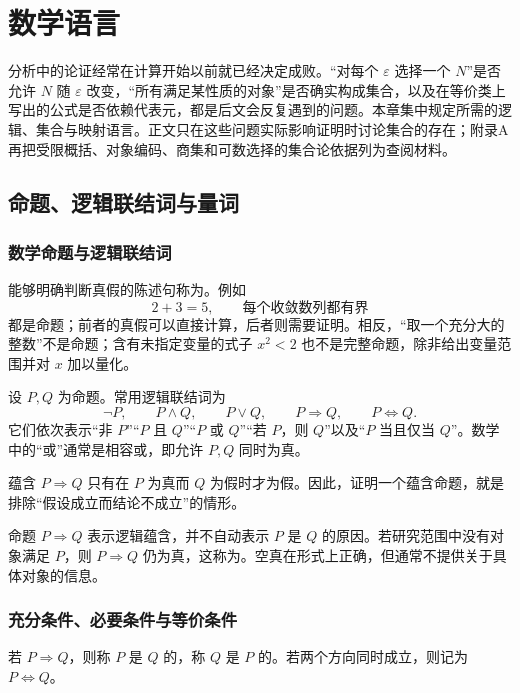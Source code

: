 \chapter{数学语言}
\label{chap:mathematical-language}

分析中的论证经常在计算开始以前就已经决定成败。“对每个 \(\varepsilon\) 选择一个 \(N\)”是否允许 \(N\) 随 \(\varepsilon\) 改变，“所有满足某性质的对象”是否确实构成集合，以及在等价类上写出的公式是否依赖代表元，都是后文会反复遇到的问题。本章集中规定所需的逻辑、集合与映射语言。正文只在这些问题实际影响证明时讨论集合的存在；附录A再把受限概括、对象编码、商集和可数选择的集合论依据列为查阅材料。

\section{命题、逻辑联结词与量词}

\subsection{数学命题与逻辑联结词}

能够明确判断真假的陈述句称为。例如
\[
  2+3=5,
  \qquad
  \text{每个收敛数列都有界}
\]
都是命题；前者的真假可以直接计算，后者则需要证明。相反，“取一个充分大的整数”不是命题；含有未指定变量的式子 \(x^2<2\) 也不是完整命题，除非给出变量范围并对 \(x\) 加以量化。

设 \(P,Q\) 为命题。常用逻辑联结词为
\[
  \neg P,\qquad P\land Q,\qquad P\lor Q,\qquad
  P\Rightarrow Q,\qquad P\Leftrightarrow Q.
\]
它们依次表示“非 \(P\)”“\(P\) 且 \(Q\)”“\(P\) 或 \(Q\)”“若 \(P\)，则 \(Q\)”以及“\(P\) 当且仅当 \(Q\)”。数学中的“或”通常是相容或，即允许 \(P,Q\) 同时为真。

蕴含 \(P\Rightarrow Q\) 只有在 \(P\) 为真而 \(Q\) 为假时才为假。因此，证明一个蕴含命题，就是排除“假设成立而结论不成立”的情形。

\begin{warningbox}
命题 \(P\Rightarrow Q\) 表示逻辑蕴含，并不自动表示 \(P\) 是 \(Q\) 的原因。若研究范围中没有对象满足 \(P\)，则 \(P\Rightarrow Q\) 仍为真，这称为。空真在形式上正确，但通常不提供关于具体对象的信息。
\end{warningbox}

\subsection{充分条件、必要条件与等价条件}

若 \(P\Rightarrow Q\)，则称 \(P\) 是 \(Q\) 的，称 \(Q\) 是 \(P\) 的。若两个方向同时成立，则记为 \(P\Leftrightarrow Q\)。

